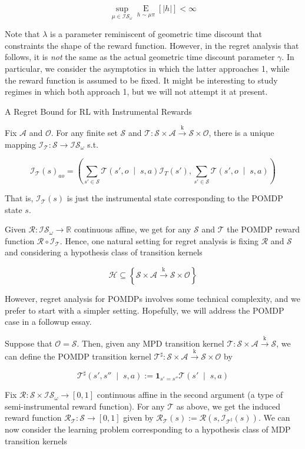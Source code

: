\documentclass[a4paper]{article}
\newcommand{\Co}[1]{}
\newcommand{\AP}[1]{\left(#1\right)}
\newcommand{\AB}[1]{\left[#1\right]}
\newcommand{\AC}[1]{\left\{#1\right\}}
\newcommand{\APM}[2]{\left(#1\;\middle\vert\;#2\right)}
\newcommand{\Ea}[2]{\underset{#1}{\operatorname{E}}\AB{#2}}
\newcommand{\Reals}{\mathbb{R}}
\newcommand{\Abs}[1]{\left\vert #1 \right\vert}
\newcommand{\K}{\xrightarrow{\mathrm{k}}}
\newcommand{\St}{\mathcal{S}}
\newcommand{\A}{\mathcal{A}}
\newcommand{\Ob}{\mathcal{O}}
\newcommand{\R}{\mathcal{R}}
\newcommand{\T}{\mathcal{T}}
\newcommand{\Hy}{\mathcal{H}}
\newcommand{\In}{\mathcal{I}}
\newcommand{\IS}{\mathcal{IS}}
\begin{document}
$$\sup_{\mu\in\IS_\omega}\Ea{h\sim\mu\pi}{\Abs{h}} < \infty$$

Note that $\lambda$ is a parameter reminiscent of geometric time discount that constraints the shape of the reward function. However, in the regret analysis that follows, it is \textit{not}\Co{i} the same as the actual geometric time discount parameter $\gamma$. In particular, we consider the asymptotics in which the latter approaches 1, while the reward function is assumed to be fixed. It might be interesting to study regimes in which both approach 1, but we will not attempt it at present.

\begin{Large}A Regret Bound for RL with Instrumental Rewards\end{Large}

Fix $\A$ and $\Ob$. For any finite set $\St$ and $\T:\St\times\A\K\St\times\Ob$, there is a unique mapping $\In_\T:\St\rightarrow\IS_{\omega}$ s.t. 

$$\In_\T(s)_{ao}=\AP{\sum_{s'\in\St}\T\APM{s',o}{s,a}\In_T\AP{s'},\sum_{s'\in\St}\T\APM{s',o}{s,a}}$$

That is, $\In_\T(s)$ is just the instrumental state corresponding to the POMDP state $s$.

Given $\R:\IS_\omega\rightarrow\Reals$ continuous affine, we get for any $\St$ and $\T$ the POMDP reward function $\R\circ\In_\T$. Hence, one natural setting for regret analysis is fixing $\R$ and $\St$ and considering a hypothesis class of transition kernels

$$\Hy\subseteq\AC{\St\times\A\K\St\times\Ob}$$

However, regret analysis for POMDPs involves some technical complexity, and we prefer to start with a simpler setting. Hopefully, we will address the POMDP case in a followup essay.

Suppose that $\Ob=\St$. Then, given any MPD transition kernel $\T:\St\times\A\K\St$, we can define the POMDP transition kernel $\T^\sharp:\St\times\A\K\St\times\Ob$ by

$$\T^\sharp\APM{s',s''}{s,a}:=\boldsymbol{1}_{s'=s''}\T\APM{s'}{s,a}$$

Fix $\R:\St\times\IS_\omega\rightarrow[0,1]$ continuous affine in the second argument (a type of semi-instrumental reward function). For any $\T$ as above, we get the induced reward function $\R_\T:\St\rightarrow[0,1]$ given by $\R_\T(s):=\R\AP{s,\In_{\T^\sharp}(s)}$. We can now consider the learning problem corresponding to a hypothesis class of MDP transition kernels
\end{document}
